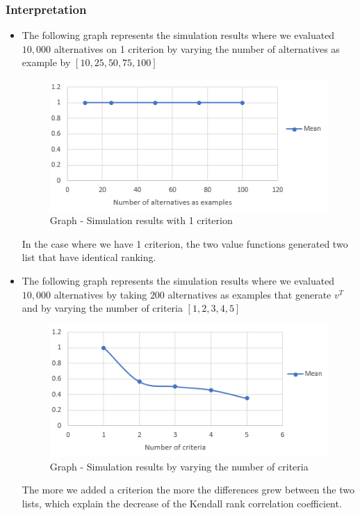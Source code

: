 \documentclass{report}
\begin{document}
\subsubsection{Interpretation}
\begin{itemize}
\item The following graph represents the simulation results where we evaluated $10,000$ alternatives on 1 criterion by varying the number of alternatives as example by $[10, 25, 50, 75, 100]$ 
\begin{figure}[H]
\centering
\includegraphics[keepaspectratio]{graph-01.PNG}
\caption{Graph - Simulation results with 1 criterion}
\end{figure}
In the case where we have 1 criterion, the two value functions generated two list that have identical ranking.\\

\item The following graph represents the simulation results where we evaluated $10,000$ alternatives by taking $200$ alternatives as examples that generate $v^T$ and by varying the number of criteria $[1, 2, 3, 4, 5]$ 
\begin{figure}[H]
\centering
\includegraphics[keepaspectratio]{graph-02.PNG}
\caption{Graph - Simulation results by varying the number of criteria}
\end{figure}
The more we added a criterion the more the differences grew between the two lists, which explain the decrease of the Kendall rank correlation coefficient.\\


\end{itemize}
\end{document}
